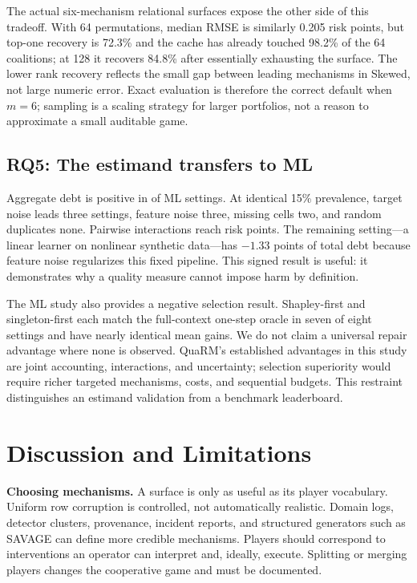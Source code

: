 \documentclass[conference]{IEEEtran}
\begin{document}
The actual six-mechanism relational surfaces expose the other side of this tradeoff. With 64 permutations, median RMSE is similarly 0.205 risk points, but top-one recovery is 72.3\% and the cache has already touched 98.2\% of the 64 coalitions; at 128 it recovers 84.8\% after essentially exhausting the surface. The lower rank recovery reflects the small gap between leading mechanisms in Skewed, not large numeric error. Exact evaluation is therefore the correct default when $m=6$; sampling is a scaling strategy for larger portfolios, not a reason to approximate a small auditable game.

\subsection{RQ5: The estimand transfers to ML}

Aggregate debt is positive in \MLPositive{} of \MLSettings{} ML settings. At identical 15\% prevalence, target noise leads three settings, feature noise three, missing cells two, and random duplicates none. Pairwise interactions reach \MLMaxInteraction{} risk points. The remaining setting---a linear learner on nonlinear synthetic data---has $-1.33$ points of total debt because feature noise regularizes this fixed pipeline. This signed result is useful: it demonstrates why a quality measure cannot impose harm by definition.

The ML study also provides a negative selection result. Shapley-first and singleton-first each match the full-context one-step oracle in seven of eight settings and have nearly identical mean gains. We do not claim a universal repair advantage where none is observed. QuaRM's established advantages in this study are joint accounting, interactions, and uncertainty; selection superiority would require richer targeted mechanisms, costs, and sequential budgets. This restraint distinguishes an estimand validation from a benchmark leaderboard.

\section{Discussion and Limitations}

\textbf{Choosing mechanisms.} A surface is only as useful as its player vocabulary. Uniform row corruption is controlled, not automatically realistic. Domain logs, detector clusters, provenance, incident reports, and structured generators such as SAVAGE can define more credible mechanisms. Players should correspond to interventions an operator can interpret and, ideally, execute. Splitting or merging players changes the cooperative game and must be documented.
\end{document}
